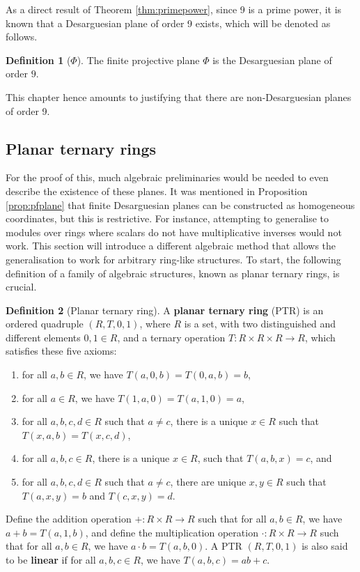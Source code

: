 \documentclass{report}
\theoremstyle{definition}\newtheorem*{definition}{Definition}
\theoremstyle{definition}\newtheorem*{example}{Example}
\theoremstyle{remark}\newtheorem*{remark}{Remark}
\begin{document}
As a direct result of Theorem \ref{thm:primepower}, since 9 is a prime power, it is known that a Desarguesian plane of order 9 exists, which will be denoted as follows.

\begin{definition}[$ \Phi $]
The finite projective plane $ \Phi $ is the Desarguesian plane of order $ 9 $.
\end{definition}

This chapter hence amounts to justifying that there are non-Desarguesian planes of order 9.

\subsection{Planar ternary rings}

For the proof of this, much algebraic preliminaries would be needed to even describe the existence of these planes. It was mentioned in Proposition \ref{prop:pfplane} that finite Desarguesian planes can be constructed as homogeneous coordinates, but this is restrictive. For instance, attempting to generalise to modules over rings where scalars do not have multiplicative inverses would not work. This section will introduce a different algebraic method that allows the generalisation to work for arbitrary ring-like structures. To start, the following definition of a family of algebraic structures, known as planar ternary rings, is crucial.

\begin{definition}[Planar ternary ring]
A \textbf{planar ternary ring} (PTR) is an ordered quadruple $ (R, T, 0, 1) $, where $ R $ is a set, with two distinguished and different elements $ 0, 1 \in R $, and a ternary operation $ T : R \times R \times R \to R $, which satisfies these five axioms:
\begin{enumerate}
  \item for all $ a, b \in R $, we have $ T(a, 0, b) = T(0, a, b) = b $,
  \item for all $ a \in R $, we have $ T(1, a, 0) = T(a, 1, 0) = a $,
  \item for all $ a, b, c, d \in R $ such that $ a \ne c $, there is a unique $ x \in R $ such that $ T(x, a, b) = T(x, c, d) $,
  \item for all $ a, b, c \in R $, there is a unique $ x \in R $, such that $ T(a, b, x) = c $, and
  \item for all $ a, b, c, d \in R $ such that $ a \ne c $, there are unique $ x, y \in R $ such that $ T(a, x, y) = b $ and $ T(c, x, y) = d $.
\end{enumerate}
Define the addition operation $ + : R \times R \to R $ such that for all $ a, b \in R $, we have $ a + b = T(a, 1, b) $, and define the multiplication operation $ \cdot : R \times R \to R $ such that for all $ a, b \in R $, we have $ a \cdot b = T(a, b, 0) $. A PTR $ (R, T, 0, 1) $ is also said to be \textbf{linear} if for all $ a, b, c \in R $, we have $ T(a, b, c) = ab + c $.
\end{definition}
\end{document}
